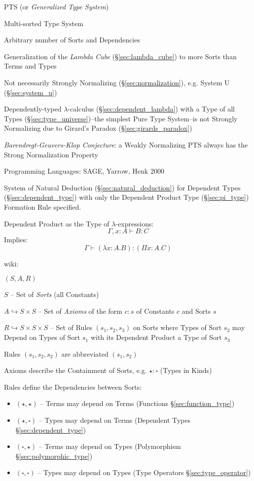 PTS (or \emph{Generalized Type System})

Multi-sorted Type System

Arbitrary number of Sorts and Dependencies

Generalization of the \emph{Lambda Cube} (\S\ref{sec:lambda_cube}) to
more Sorts than Terms and Types

Not necessarily Strongly Normalizing (\S\ref{sec:normalization}), e.g.
System U (\S\ref{sec:system_u})

Dependently-typed $\lambda$-calculus (\S\ref{sec:dependent_lambda})
with a Type of all Types (\S\ref{sec:type_universe})--the simplest
Pure Type System--is not Strongly Normalizing due to Girard's Paradox
(\S\ref{sec:girards_paradox})

\emph{Barendregt-Geuvers-Klop Conjecture}: a Weakly Normalizing PTS
always has the Strong Normalization Property

Programming Languages: SAGE, Yarrow, Henk 2000


System of Natural Deduction (\S\ref{sec:natural_deduction}) for
Dependent Types (\S\ref{sec:dependent_type}) with only the Dependent
Product Type (\S\ref{sec:pi_type}) Formation Rule specified.

Dependent Product as the Type of $\lambda$-expressions:
\[
  \Gamma,x:A \vdash B:C
\]
Implies:
\[
  \Gamma \vdash (\lambda x:A.B):(\Pi x:A.C)
\]


\asterism


wiki:

$(S,A,R)$

$S$ -- Set of \emph{Sorts} (all Constants)

$A \hookrightarrow S \times S$ -- Set of \emph{Axioms} of the form
$c:s$ of Constants $c$ and Sorts $s$

$R \hookrightarrow S \times S \times S$ -- Set of Rules
$(s_1,s_2,s_3)$ on Sorts where Types of Sort $s_2$ may Depend on Types
of Sort $s_1$ with its Dependent Product a Type of Sort $s_3$

Rules $(s_1,s_2,s_2)$ are abbreviated
$(s_1,s_2)$

Axioms describe the Containment of Sorts, e.g. $\star:\square$ (Types
in Kinds)

Rules define the Dependencies between Sorts:
\begin{itemize}
  \item $(\star,\star)$ -- Terms may depend on Terms (Functions
    \S\ref{sec:function_type})
  \item $(\star,\square)$ -- Types may depend on Terms (Dependent
    Types \S\ref{sec:dependent_type})
  \item $(\square,\star)$ -- Terms may depend on Types (Polymorphism
    \S\ref{sec:polymorphic_type})
  \item $(\square,\square)$ -- Types may depend on Types (Type
    Operators \S\ref{sec:type_operator})
\end{itemize}

